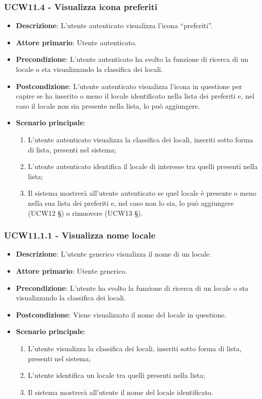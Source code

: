 \subsubsection{UCW11.4 - Visualizza icona preferiti}
\begin{itemize}
    \item \textbf{Descrizione}: L'utente autenticato visualizza l'icona “preferiti”.
    \item \textbf{Attore primario}: Utente autenticato.
    \item \textbf{Precondizione}: L'utente autenticato ha svolto la funzione di ricerca di un locale o sta visualizzando la classifica dei locali.
    \item \textbf{Postcondizione}: L'utente autenticato visualizza l'icona in questione per capire se ha inserito o meno il locale identificato nella lista dei preferiti e, nel caso il locale non sia presente nella lista, lo può aggiungere.
    \item \textbf{Scenario principale}: 
    \begin{enumerate}
    \item L'utente autenticato visualizza la classifica dei locali, inseriti sotto forma di lista, presenti nel sistema;
    \item L'utente autenticato identifica il locale di interesse tra quelli presenti nella lista;
    \item Il sistema mostrerà all'utente autenticato se quel locale è presente o meno nella sua lista dei preferiti e, nel caso non lo sia, lo può aggiungere (UCW12 \S{}) o rimuovere (UCW13 \S{}).
    \end{enumerate}
\end{itemize}

\subsubsection{UCW11.1.1 - Visualizza nome locale}
\begin{itemize}
    \item \textbf{Descrizione}: L'utente generico visualizza il nome di un locale.
    \item \textbf{Attore primario}: Utente generico.
    \item \textbf{Precondizione}: L'utente ha svolto la funzione di ricerca di un locale o sta visualizzando la classifica dei locali.
    \item \textbf{Postcondizione}: Viene visualizzato il nome del locale in questione.
    \item \textbf{Scenario principale}: 
    \begin{enumerate}
	\item L'utente visualizza la classifica dei locali, inseriti sotto forma di lista, presenti nel sistema;
    \item L'utente identifica un locale tra quelli presenti nella lista;
	\item Il sistema mostrerà all'utente il nome del locale identificato.
    \end{enumerate}
\end{itemize}

